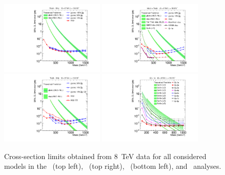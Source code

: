 \begin{figure}
\centering
  \includegraphics[clip=true, trim=0.0cm 0cm 2.8cm 0cm, width=0.44\textwidth]{figures/muonly/MOExclusionLog}
  \includegraphics[clip=true, trim=0.0cm 0cm 2.8cm 0cm, width=0.44\textwidth]{figures/tkmu/MuExclusionLog} \\
  \includegraphics[clip=true, trim=0.0cm 0cm 2.8cm 0cm, width=0.44\textwidth]{figures/tkonly/TkExclusionLog}
  \includegraphics[clip=true, trim=0.0cm 0cm 2.8cm 0cm, width=0.44\textwidth]{figures/multi/HQExclusionLog}
\caption[Cross-section limits obtained from 8~TeV data for all considered models in the analyses]
{Cross-section limits obtained from 8~TeV data for all considered models in the \muononly\ (top left), \tktof\ (top right), \tkonly\ (bottom left), and \multi\ analyses.}
    \label{fig:Exclusion}
\end{figure}

